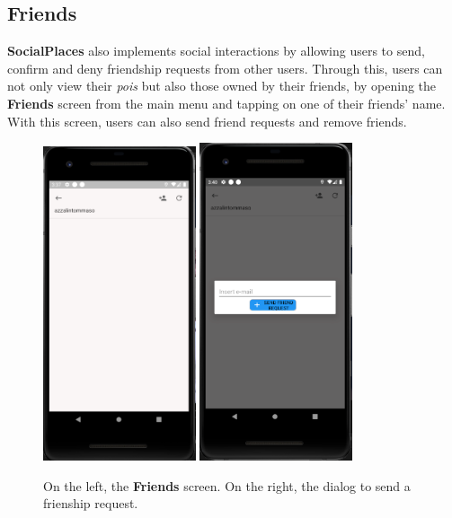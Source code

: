 \documentclass[../../main]{subfiles}
\begin{document}
\subsection{Friends}
\label{ss:final-friends}

\textbf{SocialPlaces} also implements social interactions by allowing users to send, confirm and deny friendship requests from other users.
Through this, users can not only view their \textit{pois} but also those owned by their friends, by opening the \textbf{Friends} screen from the main menu and tapping on one of their friends' name.
With this screen, users can also send friend requests and remove friends.
\begin{figure}[H]
    \centering
    \includegraphics[width=0.4\textwidth]{images/app/friend/friend_overwiew}
    \includegraphics[width=0.4\textwidth]{images/app/friend/send_request}
    \caption{On the left, the \textbf{Friends} screen. On the right, the dialog to send a frienship request.}
\end{figure}
\end{document}
